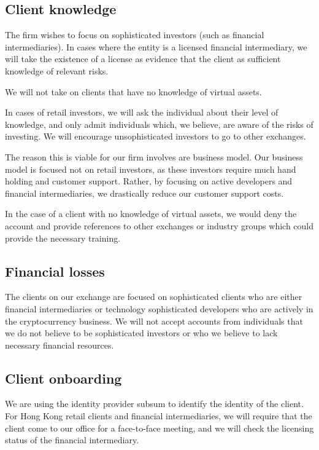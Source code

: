 \subsection{Client knowledge}

The firm wishes to focus on sophisticated investors (such as financial
intermediaries).  In cases where the entity is a licensed
financial intermediary, we will take the existence of a license as
evidence that the client as sufficient knowledge of relevant risks.

We will not take on clients that have no knowledge of virtual assets.

In cases of retail investors, we will ask the individual about their
level of knowledge, and only admit individuals which, we believe, are
aware of the risks of investing.  We will encourage unsophisticated
investors to go to other exchanges.

The reason this is viable for our firm involves are business model.
Our business model is focused not on retail investors, as these
investors require much hand holding and customer support.  Rather, by
focusing on active developers and financial intermediaries, we
drastically reduce our customer support costs.

In the case of a client with no knowledge of virtual assets, we would deny
the account and provide references to other exchanges or industry
groups which could provide the necessary training.

\subsection{Financial losses}

The clients on our exchange are focused on sophisticated clients who
are either financial intermediaries or technology sophisticated
developers who are actively in the cryptocurrency business.  We will
not accept accounts from individuals that we do not believe to be
sophisticated investors or who we believe to lack necessary financial
resources.

\subsection{Client onboarding}

We are using the identity provider subsum to identify the identity of
the client.  For Hong Kong retail clients and financial
intermediaries, we will require that the client come to our office for
a face-to-face meeting, and we will check the licensing status of the
financial intermediary.

